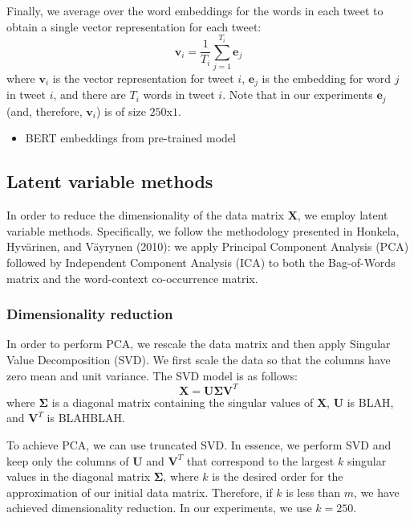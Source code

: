 \documentclass{article}
\begin{document}
Finally, we average over the word embeddings for the words in each tweet
to obtain a single vector representation for each tweet:
\[\mathbf{v}_i=\frac {1} {T_i} \sum_{j=1}^{T_i}{\mathbf{e}_j}\] where
\(\mathbf{v}_i\) is the vector representation for tweet \(i\),
\(\mathbf{e}_j\) is the embedding for word \(j\) in tweet \(i\), and
there are \(T_i\) words in tweet \(i\). Note that in our experiments
\(\mathbf{e}_j\) (and, therefore, \(\mathbf{v}_i\)) is of size
\(250\)x\(1\).

\begin{itemize}
\tightlist
\item
  BERT embeddings from pre-trained model
\end{itemize}

\hypertarget{latent-variable-methods}{%
\subsection{Latent variable methods}\label{latent-variable-methods}}

In order to reduce the dimensionality of the data matrix \(\mathbf{X}\),
we employ latent variable methods. Specifically, we follow the
methodology presented in Honkela, Hyvärinen, and Väyrynen (2010): we
apply Principal Component Analysis (PCA) followed by Independent
Component Analysis (ICA) to both the Bag-of-Words matrix and the
word-context co-occurrence matrix.

\hypertarget{dimensionality-reduction}{%
\subsubsection{Dimensionality
reduction}\label{dimensionality-reduction}}

In order to perform PCA, we rescale the data matrix and then apply
Singular Value Decomposition (SVD). We first scale the data so that the
columns have zero mean and unit variance. The SVD model is as follows:
\[\mathbf{X = U \Sigma V}^T\] where \(\mathbf{\Sigma}\) is a diagonal
matrix containing the singular values of \(\mathbf{X}\), \(\mathbf{U}\)
is BLAH, and \(\mathbf{V}^T\) is BLAHBLAH.

To achieve PCA, we can use truncated SVD. In essence, we perform SVD and
keep only the columns of \(\mathbf{U}\) and \(\mathbf{V}^T\) that
correspond to the largest \(k\) singular values in the diagonal matrix
\(\mathbf{\Sigma}\), where \(k\) is the desired order for the
approximation of our initial data matrix. Therefore, if \(k\) is less
than \(m\), we have achieved dimensionality reduction. In our
experiments, we use \(k = 250\).
\end{document}
